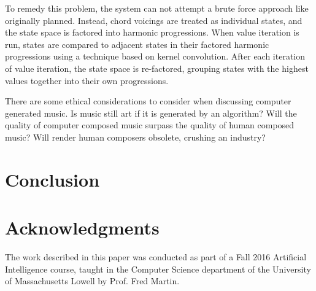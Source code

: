 \documentclass{chi2009}
\begin{document}
To remedy this problem, the system can not attempt a brute force approach like originally planned.  Instead, chord voicings are treated as individual states, and the state space is factored into harmonic progressions.  When value iteration is run, states are compared to adjacent states in their factored harmonic progressions using a technique based on kernel convolution.  After each iteration of value iteration, the state space is re-factored, grouping states with the highest values together into their own progressions.

There are some ethical considerations to consider when discussing computer generated music.  Is music still art if it is generated by an algorithm?
Will the quality of computer composed music surpass the quality of human composed music?  Will render human composers obsolete, crushing an industry?  

\section{Conclusion}

\section{Acknowledgments}
The work described in this paper was conducted as part of a Fall 2016 Artificial Intelligence course, taught in the Computer Science department of the University of Massachusetts Lowell by Prof. Fred Martin.
\end{document}
